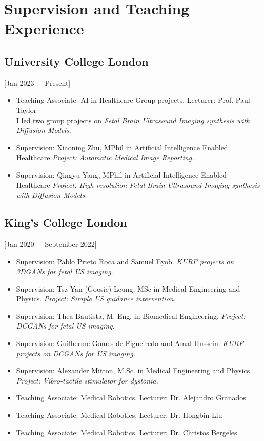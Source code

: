 \documentclass{mycv}
\begin{document}
\section{Supervision and Teaching Experience}

\subsection{University College London}[Jan 2023~--~Present]
\begin{itemize}
	\item Teaching Associate: AI in Healthcare Group projects. Lecturer: Prof. Paul Taylor 
	\\ I led two group projects on \textit{Fetal Brain Ultrasound Imaging synthesis with Diffusion Models}.
	\item Supervision: Xiaoning Zhu, MPhil in Artificial Intelligence Enabled Healthcare
		\textit{Project: Automatic Medical Image Reporting.}
	\item Supervision: Qingyu Yang, MPhil in Artificial Intelligence Enabled Healthcare
		\textit{Project: High-resolution Fetal Brain Ultrasound Imaging synthesis with Diffusion Models.}
\end{itemize}

\subsection{King's College London}[Jan 2020~--~September 2022]
\begin{itemize}
	\item 	Supervision: Pablo Prieto Roca and Samuel Eyob. 
		\textit{KURF projects on 3DGANs for fetal US imaging}. 
	\item 	Supervision: Tsz Yan (Goosie) Leung, MSc in Medical Engineering and Physics. 
		\textit{Project: Simple US guidance intervention.} 
	\item 	Supervision: Thea Bautista, M. Eng. in Biomedical Engineering. 
		\textit{Project: DCGANs for fetal US imaging.} 
	\item 	Supervision: Guilherme Gomes de Figueiredo and Amal Hussein. 
		\textit{KURF projects on DCGANs for US imaging.}
	\item 	Supervision: Alexander Mitton, M.Sc. in Medical Engineering and Physics. 
		\textit{Project: Vibro-tactile stimulator for dystonia.}
	\item Teaching Associate: Medical Robotics. Lecturer: Dr. Alejandro Granados 
	\item Teaching Associate: Medical Robotics. Lecturer: Dr. Hongbin Liu 
	\item Teaching Associate: Medical Robotics. Lecturer: Dr. Christos Bergeles 
\end{itemize}
\end{document}
